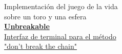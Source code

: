 \documentclass[12pt, letterpaper]{article}
\renewcommand{\normalsize}{\fontsize{13}{16}\selectfont}
\renewcommand{\small}{\fontsize{12}{14}\selectfont}
\begin{document}
\begin{tcolorbox}[colback=box-color, sharp corners=all, width=\paperwidth, height=7.2cm, boxrule=0pt, colframe=box-color]
\begin{minipage}[t]{0.43\textwidth}
{	 		\hspace*{0.1cm} \small Implementación del juego de la vida \\\hspace*{0.1cm} sobre un toro y una esfera} \bigskip\\
	 		\href{https://github.com/UnbreakableChain}{
	 		\textcolor{highlight-color}{\normalsize \textbf{Unbreakable}} \smallskip\\
	 		\hspace*{0.1cm} \small Interfaz de terminal para el método\\
\hspace*{0.1cm} "don't break the chain"}\\
	 	\end{minipage}
	\end{tcolorbox}
\clearpage
\end{document}
